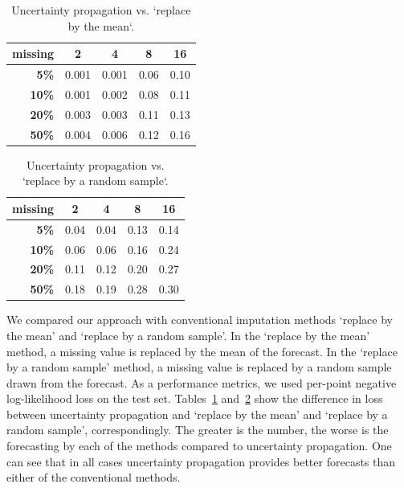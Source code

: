 \documentclass[runningheads]{llncs}
\begin{document}
\begin{table}
\caption{Uncertainty propagation vs. `replace by the mean`.}
\label{tab:replace-by-mean}
	\setlength\tabcolsep{18pt}
	\centering
	\begin{tabular}{r|c c c c}
	 \textbf{missing} & \textbf{2} & \textbf{4} & \textbf{8} & \textbf{16} \\ \hline
		  \textbf{5\%} & 0.001 & 0.001 &  0.06 & 0.10  \\
		 \textbf{10\%} & 0.001 & 0.002 &  0.08 & 0.11  \\
		 \textbf{20\%} & 0.003 & 0.003 &  0.11 & 0.13  \\
		 \textbf{50\%} & 0.004 & 0.006 &  0.12 & 0.16  
	\end{tabular}
\end{table}
\begin{table}
\caption{Uncertainty propagation vs. `replace by a random sample`.}
\vspace{1em}
\label{tab:replace-by-sample}
	\setlength\tabcolsep{18pt}
	\centering
	\begin{tabular}{r|c c c c}
	 \textbf{missing} & \textbf{2} & \textbf{4} & \textbf{8} & \textbf{16} \\ \hline
		  \textbf{5\%} & 0.04 & 0.04 & 0.13 & 0.14 \\
		 \textbf{10\%} & 0.06 & 0.06 & 0.16 & 0.24 \\
		 \textbf{20\%} & 0.11 & 0.12 & 0.20 & 0.27 \\
		 \textbf{50\%} & 0.18 & 0.19 & 0.28 & 0.30   
	\end{tabular}
\end{table}
We compared our approach with conventional imputation methods
`replace by the mean' and `replace by a random sample'.
In the `replace by the mean' method, a missing value is replaced 
by the mean of the forecast. In the `replace by a random
sample' method, a missing value is replaced by a random sample
drawn from the forecast. As a performance metrics, we
used per-point negative log-likelihood loss on the test set. 
Tables~\ref{tab:replace-by-mean} and~\ref{tab:replace-by-sample}
show the difference in loss between uncertainty propagation and
`replace by the mean' and `replace by a random sample',
correspondingly. The greater is the number, the worse is the
forecasting by each of the methods compared to uncertainty
propagation.
One can see that in all cases uncertainty propagation provides
better forecasts than either of the conventional methods. 
\end{document}
